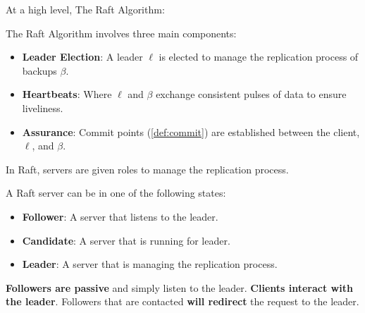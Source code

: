 \noindent
At a high level, The Raft Algorithm:
\begin{Def}

    The Raft Algorithm involves three main components:
    \begin{itemize}
        \item \textbf{Leader Election}: A leader $\ell$ is elected to manage the replication process of backups $\beta$.
        \item \textbf{Heartbeats}: Where $\ell$ and $\beta$ exchange consistent pulses of data to ensure liveliness.
        \item \textbf{Assurance}: Commit points (\ref{def:commit}) are established between the client, $\ell$, and $\beta$. 
    \end{itemize}
\end{Def}
\noindent
In Raft, servers are given roles to manage the replication process.
\begin{Def}

    A Raft server can be in one of the following states:
    \begin{itemize}
        \item \textbf{Follower}: A server that listens to the leader.
        \item \textbf{Candidate}: A server that is running for leader.
        \item \textbf{Leader}: A server that is managing the replication process.
    \end{itemize}
    \textbf{Followers are passive} and simply listen to the leader. \textbf{Clients interact with the leader}. Followers that are contacted \textbf{will redirect} the request to the leader.
\end{Def}
